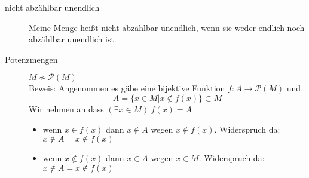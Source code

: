 \begin{description}
\begin{description}
        \item[nicht abzählbar unendlich] Meine Menge heißt nicht abzählbar unendlich, wenn sie weder endlich noch abzählbar unendlich ist.
        \item[Potenzmengen]$M \not \sim \mathcal{P}(M)$\\ Beweis:
        Angenommen es gäbe eine bijektive Funktion $f : A \longrightarrow \mathcal{P}(M)$ und
        \[A = \lbrace x \in M | x \not \in f(x) \rbrace \subset M\]
        Wir nehmen an dass $(\exists x \in M)\ f(x) = A$
        \begin{itemize}
            \item wenn $x \in f(x) $ dann $x \not \in A$ wegen $x \not \in f(x)$.
            Widerspruch da: $x \not \in A = x \not \in f(x)$
            \item wenn $x \not \in f(x)$ dann $x \in A$ wegen $x \in M$.
            Widerspruch da: $x \not \in A = x \not \in f(x)$
        \end{itemize}
    \end{description}
\end{description}
